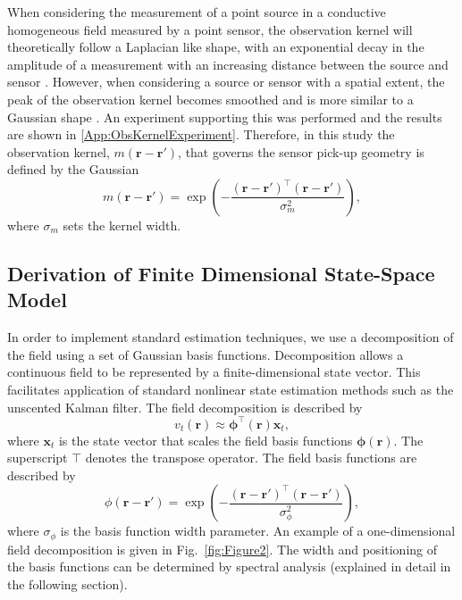\documentclass[review,authoryear,3p]{elsarticle}
\begin{document}
When considering the measurement of a point source in a conductive homogeneous field measured by a point sensor, the observation kernel will theoretically follow a Laplacian like shape, with an exponential decay in the amplitude of a measurement with an increasing distance between the source and sensor \citep{Jackson1999}. However, when considering a source or sensor with a spatial extent, the peak of the observation kernel becomes smoothed and is more similar to a Gaussian shape \citep{Jackson1999}. An experiment supporting this was performed and the results are shown in \ref{App:ObsKernelExperiment}. Therefore, in this study the observation kernel, $m(\mathbf{r}-\mathbf{r}')$, that governs the sensor pick-up geometry is defined by the Gaussian
\begin{equation}
	m\left(\mathbf{r}-\mathbf{r}'\right) = \exp{\left(-\frac{(\mathbf{r}-\mathbf{r}')^\top(\mathbf{r}-\mathbf{r}')}{\sigma_m^2}\right)},
\end{equation}
where $\sigma_m$ sets the kernel width. 

\subsection{Derivation of Finite Dimensional State-Space Model}\label{Sect:ReducedModelDerivation}
In order to implement standard estimation techniques, we use a decomposition of the field using a set of Gaussian basis functions. Decomposition allows a continuous field to be represented by a finite-dimensional state vector. This facilitates application of standard nonlinear state estimation methods such as the unscented Kalman filter. The field decomposition is described by
\begin{equation}
	\label{DefFieldDecomp} v_t\left(\mathbf{r}\right) \approx \boldsymbol{\phi}^{\top}\left(\mathbf{r}\right) \mathbf{x}_t, 
\end{equation}
where $\mathbf{x}_t$ is the state vector that scales the field basis functions $\mathbf{\boldsymbol{\phi}}(\mathbf{r})$. The superscript $\top$ denotes the transpose operator. The field basis functions are described by
\begin{equation}\label{eq:FieldBasisFunction}
	\phi\left(\mathbf{r}-\mathbf{r}'\right) =
\exp{\left(-\frac{(\mathbf{r}-\mathbf{r}')^\top(\mathbf{r}-\mathbf{r}')}{\sigma_{\phi}^2}\right)}, 
\end{equation}
where $\sigma_{\phi}$ is the basis function width parameter. An example of a one-dimensional field decomposition is given in Fig.~\ref{fig:Figure2}. The width and positioning of the basis functions can be determined by spectral analysis (explained in detail in the following section). 
\end{document}

